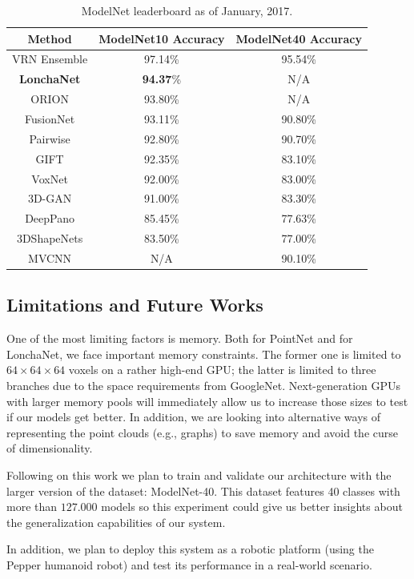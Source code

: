 \begin{table}[!htb]
	\centering
	\begin{tabular}{ccc}
    	Method & ModelNet10 Accuracy & ModelNet40 Accuracy\\
        \hline
        VRN Ensemble \cite{Brock2016} & 97.14\% & 95.54\%\\
        \textbf{LonchaNet} & \textbf{94.37}\% & N/A\\
        ORION \cite{Sedaghat2016} & 93.80\% & N/A\\
        FusionNet \cite{Hegde2016} & 93.11\% & 90.80\% \\
        Pairwise \cite{Johns2016} & 92.80\% & 90.70\% \\
        GIFT \cite{Bai2016} & 92.35\% & 83.10\% \\
        VoxNet \cite{Maturana2015} & 92.00\% & 83.00\% \\
        3D-GAN \cite{Wu2016} & 91.00\% & 83.30\% \\
        DeepPano \cite{Shi2015} & 85.45\% & 77.63\% \\
        3DShapeNets \cite{Wu2015} & 83.50\% & 77.00\% \\
        MVCNN \cite{Su2015} & N/A & 90.10\% \\
        \hline
    \end{tabular}
    \caption{ModelNet leaderboard as of January, 2017.}
    \label{table:objrecog:modelnet_leaderboard}
\end{table}

\subsection{Limitations and Future Works}

One of the most limiting factors is memory. Both for PointNet and for LonchaNet, we face important memory constraints. The former one is limited to $64\times 64\times 64$ voxels on a rather high-end \ac{GPU}; the latter is limited to three branches due to the space requirements from GoogleNet. Next-generation \acp{GPU} with larger memory pools will immediately allow us to increase those sizes to test if our models get better. In addition, we are looking into alternative ways of representing the point clouds (e.g., graphs) to save memory and avoid the curse of dimensionality.

Following on this work we plan to train and validate our architecture with the larger version of the dataset: ModelNet-40. This dataset features 40 classes with more than $127.000$ models so this experiment could give us better insights about the generalization capabilities of our system.

In addition, we plan to deploy this system as a robotic platform (using the Pepper humanoid robot) and test its performance in a real-world scenario.